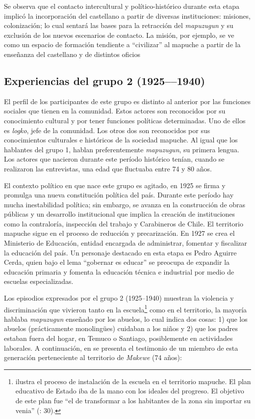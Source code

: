 \documentclass[output=paper]{../langscibook}
\begin{document}
Se observa que el contacto intercultural y político-histórico durante esta etapa implicó la incorporación del castellano a partir de diversas instituciones: misiones, colonización; lo cual sentará las bases para la retracción del \textit{mapuzugun} y su exclusión de los nuevos escenarios de contacto. La misión, por ejemplo, se ve como un espacio de formación tendiente a “civilizar” al mapuche a partir de la enseñanza del castellano y de distintos oficios {\citet{OlateVinet2017}}



\subsection{Experiencias del grupo 2 (1925––1940)}



El perfil de los participantes de este grupo es distinto al anterior por las funciones sociales que tienen en la comunidad. Estos actores son reconocidos por su conocimiento cultural y por tener funciones políticas determinadas. Uno de ellos es \textit{logko}, jefe de la comunidad. Los otros dos son reconocidos por sus conocimientos culturales e históricos de la sociedad mapuche. Al igual que los hablantes del grupo 1, hablan preferentemente \textit{mapuzugun}, su primera lengua. Los actores que nacieron durante este período histórico tenían, cuando se realizaron las entrevistas, una edad que fluctuaba entre 74 y 80 años.  

El contexto político en que nace este grupo es agitado, en 1925 se firma y promulga una nueva constitución política del país. Durante este período hay mucha inestabilidad política; sin embargo, se avanza en la construcción de obras públicas y un desarrollo institucional que implica la creación de instituciones como la contraloría, inspección del trabajo y Carabineros de Chile. El territorio mapuche sigue en el proceso de reducción y precarización. En 1927 se crea el Ministerio de Educación, entidad encargada de administrar, fomentar y fiscalizar la educación del país. Un personaje destacado en esta etapa es Pedro Aguirre Cerda, quien bajo el lema “gobernar es educar” se preocupa de expandir la educación primaria y fomenta la educación técnica e industrial por medio de escuelas especializadas.

Los episodios expresados por el grupo 2 (1925--1940) muestran la violencia y discriminación que vivieron tanto en la escuela\footnote{\citet{DonosoRomo2008} ilustra el proceso de instalación de la escuela en el territorio mapuche. El plan educativo de Estado iba de la mano con los ideales del progreso. El objetivo de este plan fue “el de transformar a los habitantes de la zona sin importar su venia” (\citealt{DonosoRomo2008}: 30).} como en el territorio, la mayoría hablaba \textit{mapuzugun} enseñado por los abuelos, lo cual indica dos cosas: 1) que los abuelos (prácticamente monolingües) cuidaban a los niños y 2) que los padres estaban fuera del hogar, en Temuco o Santiago, posiblemente en actividades laborales. A continuación, en  se presenta el testimonio de un miembro de esta generación perteneciente al territorio de \textit{Makewe} (74 años):
\end{document}

